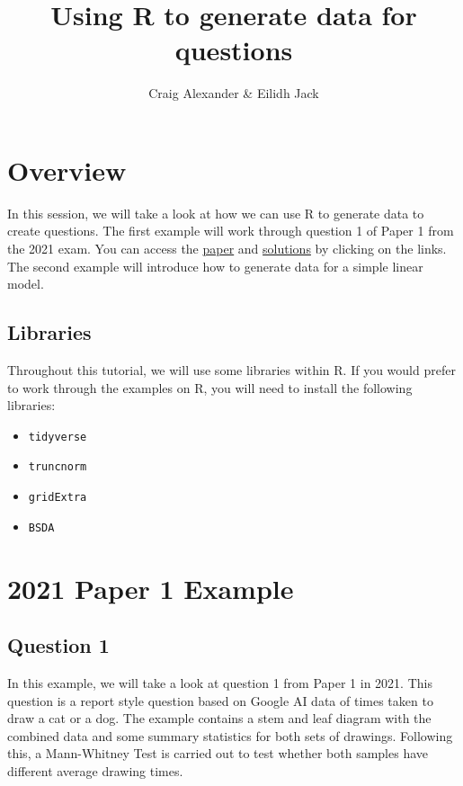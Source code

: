 \documentclass[
]{book}
\title{Using R to generate data for questions}
\author{Craig Alexander \& Eilidh Jack}
\date{}
\providecommand{\tightlist}{%
  \setlength{\itemsep}{0pt}\setlength{\parskip}{0pt}}
\begin{document}
\maketitle

{
\setcounter{tocdepth}{1}
\tableofcontents
}
\hypertarget{overview}{%
\chapter{Overview}\label{overview}}

In this session, we will take a look at how we can use R to generate data to create questions. The first example will work through question 1 of Paper 1 from the 2021 exam. You can access the \href{https://www.sqa.org.uk/sqa/files_ccc/NAH_Statistics_Paper1_2021.pdf}{paper} and \href{Advanced\%20Higher\%20Statistic\%20marking\%20instructions\%20paper\%201}{solutions} by clicking on the links. The second example will introduce how to generate data for a simple linear model.

\hypertarget{libraries}{%
\section{Libraries}\label{libraries}}

Throughout this tutorial, we will use some libraries within R. If you would prefer to work through the examples on R, you will need to install the following libraries:

\begin{itemize}
\tightlist
\item
  \texttt{tidyverse}
\item
  \texttt{truncnorm}
\item
  \texttt{gridExtra}
\item
  \texttt{BSDA}
\end{itemize}

\hypertarget{paper-1-example}{%
\chapter{2021 Paper 1 Example}\label{paper-1-example}}

\hypertarget{question-1}{%
\section{Question 1}\label{question-1}}

In this example, we will take a look at question 1 from Paper 1 in 2021. This question is a report style question based on Google AI data of times taken to draw a cat or a dog. The example contains a stem and leaf diagram with the combined data and some summary statistics for both sets of drawings. Following this, a Mann-Whitney Test is carried out to test whether both samples have different average drawing times.
\end{document}

